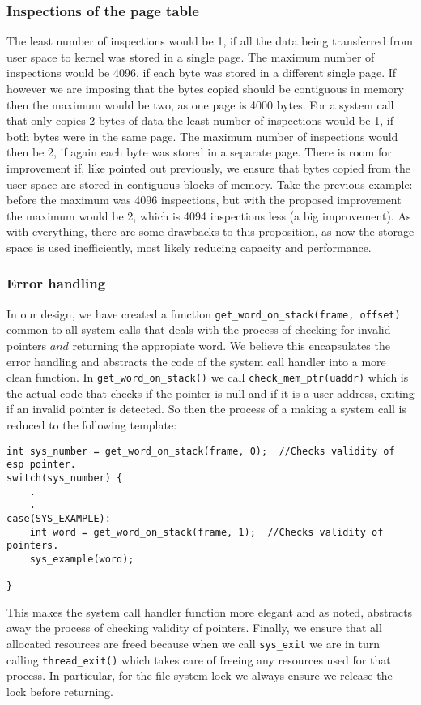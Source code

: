 \documentclass{article}
\renewcommand{\_}{\char`_}
\begin{document}
\subsubsection{Inspections of the page table}
The least number of inspections would be 1, if all the data being transferred from user space to kernel was stored in a single page. The maximum number of inspections would be 4096, if each byte was stored in a different single page. If however we are imposing that the bytes copied should be contiguous in memory then the maximum would be two, as one page is 4000 bytes. For a system call that only copies 2 bytes of data the least number of inspections would be 1, if both bytes were in the same page. The maximum number of inspections would then be 2, if again each byte was stored in a separate page. There is room for improvement if, like pointed out previously, we ensure that bytes copied from the user space are stored in contiguous blocks of memory. Take the previous example: before the maximum was 4096 inspections, but with the proposed improvement the maximum would be 2, which is 4094 inspections less (a big improvement). As with everything, there are some drawbacks to this proposition, as now the storage space is used inefficiently, most likely reducing capacity and performance.

\subsubsection{Error handling}

In our design, we have created a function  \lstinline{get_word_on_stack(frame, offset)} common to all system calls that deals with the process of checking for invalid pointers $and$ returning the appropiate word. We believe this encapsulates the error handling and abstracts the code of the system call handler into a more clean function. In \lstinline{get_word_on_stack()} we call \lstinline{check_mem_ptr(uaddr)} which is the actual code that checks if the pointer is null and if it is a user address, exiting if an invalid pointer is detected. So then the process of a making a system call is reduced to the following template:

\begin{lstlisting}
int sys_number = get_word_on_stack(frame, 0);  //Checks validity of esp pointer.
switch(sys_number) {
	.
	.
case(SYS_EXAMPLE):
	int word = get_word_on_stack(frame, 1);  //Checks validity of pointers.
	sys_example(word);

}
\end{lstlisting}

This makes the system call handler function more elegant and as noted, abstracts away the process of checking validity of pointers. Finally, we ensure that all allocated resources are freed because when we call \lstinline{sys_exit} we are in turn calling \lstinline{thread_exit()} which takes care of freeing any resources used for that process. In particular, for the file system lock we always ensure we release the lock before returning.

\end{document}
